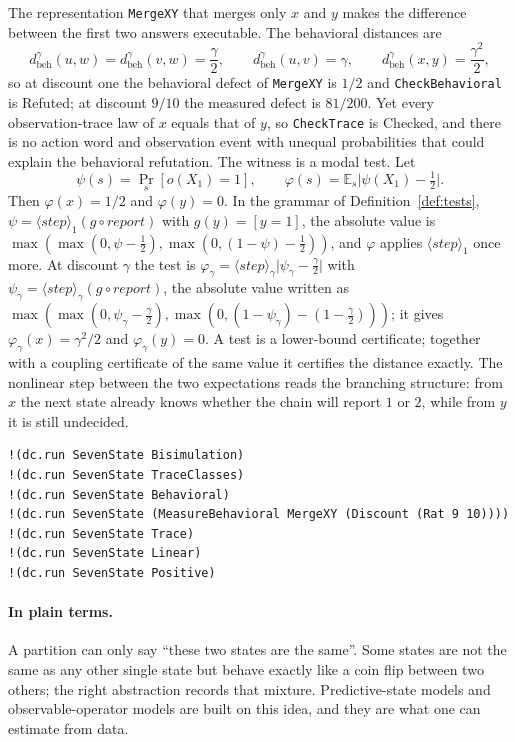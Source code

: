 \documentclass[11pt]{article}
\newcommand{\code}[1]{\texttt{#1}}
\newcommand{\dbeh}{d_{\mathrm{beh}}}
\newcommand{\plain}{\paragraph{In plain terms.}}
\theoremstyle{definition}
\theoremstyle{plain}
\begin{document}
The representation \code{MergeXY} that merges only $x$ and $y$ makes the difference between the
first two answers executable. The behavioral distances are
\[
\dbeh^\gamma(u,w)=\dbeh^\gamma(v,w)=\frac{\gamma}{2},\qquad \dbeh^\gamma(u,v)=\gamma,\qquad
\dbeh^\gamma(x,y)=\frac{\gamma^2}{2},
\]
so at discount one the behavioral defect of \code{MergeXY} is $1/2$ and \code{CheckBehavioral} is
Refuted; at discount $9/10$ the measured defect is $81/200$. Yet every observation-trace law of $x$
equals that of $y$, so \code{CheckTrace} is Checked, and there is no action word and observation
event with unequal probabilities that could explain the behavioral refutation. The witness is a
modal test. Let
\[
\psi(s)=\Pr_s[o(X_1)=1],\qquad \varphi(s)=\mathbb E_s\bigl|\psi(X_1)-\tfrac12\bigr| .
\]
Then $\varphi(x)=1/2$ and $\varphi(y)=0$. In the grammar of Definition~\ref{def:tests},
$\psi=\langle\mathit{step}\rangle_1(g\circ\mathit{report})$ with $g(y)=[y=1]$, the absolute value
is $\max(\max(0,\psi-\tfrac12),\max(0,(1-\psi)-\tfrac12))$, and $\varphi$ applies
$\langle\mathit{step}\rangle_1$ once more. At discount $\gamma$ the test is
$\varphi_\gamma=\langle\mathit{step}\rangle_\gamma\bigl|\psi_\gamma-\tfrac\gamma2\bigr|$ with
$\psi_\gamma=\langle\mathit{step}\rangle_\gamma(g\circ\mathit{report})$, the absolute value written as
$\max(\max(0,\psi_\gamma-\tfrac\gamma2),\max(0,(1-\psi_\gamma)-(1-\tfrac\gamma2)))$; it gives
$\varphi_\gamma(x)=\gamma^2/2$ and $\varphi_\gamma(y)=0$. A test is a lower-bound certificate;
together with a coupling certificate of the same value it certifies the distance exactly. The nonlinear step between
the two expectations reads the branching structure: from $x$ the next state already knows whether
the chain will report $1$ or $2$, while from $y$ it is still undecided.
\begin{lstlisting}[basicstyle=\ttfamily\footnotesize,title={\scriptsize\ttfamily fixtures/seven\_state.metta}]
!(dc.run SevenState Bisimulation)
!(dc.run SevenState TraceClasses)
!(dc.run SevenState Behavioral)
!(dc.run SevenState (MeasureBehavioral MergeXY (Discount (Rat 9 10))))
!(dc.run SevenState Trace)
!(dc.run SevenState Linear)
!(dc.run SevenState Positive)
\end{lstlisting}

\plain A partition can only say ``these two states are the same''. Some states are not the same as
any other single state but behave exactly like a coin flip between two others; the right
abstraction records that mixture. Predictive-state models and observable-operator models are built
on this idea, and they are what one can estimate from data.
\end{document}
